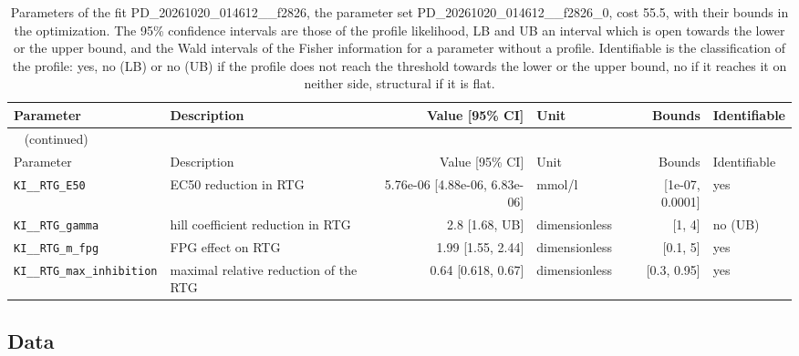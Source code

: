 \begin{longtable}{llrlrl}
\caption{Parameters of the fit PD\_20261020\_014612\_\_f2826, the parameter set PD\_20261020\_014612\_\_f2826\_0, cost 55.5, with their bounds in the optimization. The 95\% confidence intervals are those of the profile likelihood, LB and UB an interval which is open towards the lower or the upper bound, and the Wald intervals of the Fisher information for a parameter without a profile. Identifiable is the classification of the profile: yes, no (LB) or no (UB) if the profile does not reach the threshold towards the lower or the upper bound, no if it reaches it on neither side, structural if it is flat.}\label{tab:parameters:PD_20261020_014612__f2826} \\
\toprule
Parameter & Description & Value [95\% CI] & Unit & Bounds & Identifiable \\
\midrule
\endfirsthead
\multicolumn{6}{l}{\small\tablename~\thetable{} (continued)} \\
\toprule
Parameter & Description & Value [95\% CI] & Unit & Bounds & Identifiable \\
\midrule
\endhead
\bottomrule
\endlastfoot
\texttt{KI\_\_RTG\_E50} & EC50 reduction in RTG & 5.76e-06 [4.88e-06, 6.83e-06] & mmol/l & [1e-07, 0.0001] & yes \\
\texttt{KI\_\_RTG\_gamma} & hill coefficient reduction in RTG & 2.8 [1.68, UB] & dimensionless & [1, 4] & no (UB) \\
\texttt{KI\_\_RTG\_m\_fpg} & FPG effect on RTG & 1.99 [1.55, 2.44] & dimensionless & [0.1, 5] & yes \\
\texttt{KI\_\_RTG\_max\_inhibition} & maximal relative reduction of the RTG & 0.64 [0.618, 0.67] & dimensionless & [0.3, 0.95] & yes \\
\end{longtable}

\subsection{Data}

